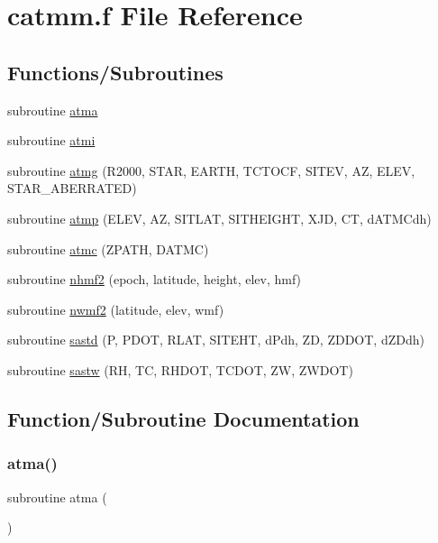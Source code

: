 \hypertarget{catmm_8f}{}\section{catmm.\+f File Reference}
\label{catmm_8f}
\subsection*{Functions/\+Subroutines}
\begin{DoxyCompactItemize}
\item 
subroutine \hyperlink{catmm_8f_a288688515ef4c9e5dae3d842804acbbb}{atma}
\item 
subroutine \hyperlink{catmm_8f_a64b184fffb62b358507fa3f7674dd19b}{atmi}
\item 
subroutine \hyperlink{catmm_8f_aca995303b1aeb100e2bc1a8f9667e6d9}{atmg} (R2000, S\+T\+AR, E\+A\+R\+TH, T\+C\+T\+O\+CF, S\+I\+T\+EV, AZ, E\+L\+EV, S\+T\+A\+R\+\_\+\+A\+B\+E\+R\+R\+A\+T\+ED)
\item 
subroutine \hyperlink{catmm_8f_a91aa038b0d7e40d535c1f571d5d8d8af}{atmp} (E\+L\+EV, AZ, S\+I\+T\+L\+AT, S\+I\+T\+H\+E\+I\+G\+HT, X\+JD, CT, d\+A\+T\+M\+Cdh)
\item 
subroutine \hyperlink{catmm_8f_ad6ac5a1de88a4a1c39a1e72ae05a28e8}{atmc} (Z\+P\+A\+TH, D\+A\+T\+MC)
\item 
subroutine \hyperlink{catmm_8f_a85f67f147367aa5457086a5af5cb3e89}{nhmf2} (epoch, latitude, height, elev, hmf)
\item 
subroutine \hyperlink{catmm_8f_aa1454243409271cf13ba3340d7fa1772}{nwmf2} (latitude, elev, wmf)
\item 
subroutine \hyperlink{catmm_8f_a3e9b0f9d2d87d197879682e7587d63b5}{sastd} (P, P\+D\+OT, R\+L\+AT, S\+I\+T\+E\+HT, d\+Pdh, ZD, Z\+D\+D\+OT, d\+Z\+Ddh)
\item 
subroutine \hyperlink{catmm_8f_a932e6b52a7f43de7069f6c44d5d4deb2}{sastw} (RH, TC, R\+H\+D\+OT, T\+C\+D\+OT, ZW, Z\+W\+D\+OT)
\end{DoxyCompactItemize}


\subsection{Function/\+Subroutine Documentation}
\mbox{\label{catmm_8f_a288688515ef4c9e5dae3d842804acbbb}} 
\subsubsection{\texorpdfstring{atma()}{atma()}}
{\footnotesize\ttfamily subroutine atma (\begin{DoxyParamCaption}{ }\end{DoxyParamCaption})}



